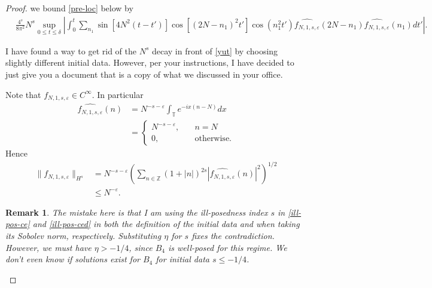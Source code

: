 \documentclass[12pt,reqno]{amsart}
\numberwithin{equation}{section}  %
\newcommand{\zz}{\mathbb{Z}}
\newcommand{\ci}{\mathbb{T}}
\newcommand{\wh}{\widehat}
\newcommand{\ee}{\varepsilon}
\newtheorem{remark}[theorem]{Remark}
\begin{document}
\begin{proof}
%
%
we bound \eqref{pre-loc} below by
%
%
\begin{equation}
  \label{yut}
\begin{split}
  & \frac{4^{s}}{8\pi^{2}} N^{s} \sup_{0 \le t \le \delta} 
  | \int_{0}^{t} \sum_{n_{1}} \sin[4N^{2}(t-t')] \cos[(2N -n_{1})^{2}t']
\cos(n_{1}^{2}t') \wh{f_{N,1,s,\ee}}(2N - n_{1})\wh{f_{N,1,s,\ee}}(n_{1}) dt' |.
\end{split}
\end{equation}
%
%
%
%
\begin{framed}
  I have found a way to get rid of the $N^{s}$ decay in front of \eqref{yut}
  by choosing slightly different initial data. However, per your instructions, I
  have decided to just give you a document that is a copy of what we discussed
  in your office. 
\end{framed}
%
%
%
%
Note that $f_{N, 1, s, \ee} \in C^{\infty}$. In particular
%
%
\begin{equation}
  \label{ill-pos-ce}
\begin{split}
  \wh{f_{N,1, s, \ee}}(n)
  & = N^{-s-\ee} \int_{\ci} e^{-ix(n - N)} dx  
  \\ 
  & = 
  \begin{cases}
     N^{-s-\ee},  \quad  & n = N
    \\
     0, \quad  & \text{otherwise}.
  \end{cases}
\end{split}
\end{equation}
%
Hence
%
%
\begin{equation}
  \label{ill-pos-ced}
\begin{split}
  \| f_{N,1, s, \ee} \|_{H^{s}}
  & = N^{-s -\ee} \left( \sum_{n \in \zz} (1 + | n |)^{2s} |
  \wh{f_{N,1, s, \ee}}(n) |^{2} \right)^{1/2}
  \\
  & \le N^{-\ee}.
\end{split}
\end{equation}
%
\begin{framed}
  \begin{remark}
    The mistake here is that I am using the ill-posedness index $s$ in \eqref{ill-pos-ce} and
    \eqref{ill-pos-ced} in both the definition of the initial data and when
    taking its Sobolev norm, respectively. Substituting $\eta$ for $s$ fixes the
    contradiction. However, we must have $\eta > -1/4$, since $B_{4}$ is
    well-posed for this regime. We don't even know if solutions exist for
    $B_{4}$ for initial data $s \le -1/4$.
  \end{remark}
\end{framed}

\end{proof}
\end{document}
